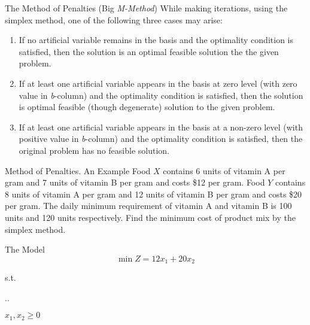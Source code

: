 \begin{frame}{The Method of Penalties (Big \emph{M-Method})}
  While making iterations, using the simplex method, one of the following three cases may arise:
  \begin{enumerate} \justifying \parskip5mm
  \item If \alert{no artificial variable remains in the basis} and the optimality condition is satisfied, then \alert{the solution is an optimal feasible solution the the given problem}.
  \item If at least one \alert{artificial variable appears in the basis at zero} level (with zero value in \emph{b}-column) and the optimality condition is satisfied, then \alert{the solution is optimal feasible (though degenerate)} solution to the given problem.
  \item If at least \alert{one artificial variable appears in the basis at a non-zero level} (with positive value in \emph{b}-column) and the optimality condition is satisfied, then \alert{the original problem has no feasible solution}.
  \end{enumerate}
\end{frame}

\begin{frame}{Method of Penalties. An Example}{}
      Food $X$ contains 6 units of vitamin A per gram and 7 units of vitamin B per gram and costs \$12  per gram. Food $Y$ contains 8 units of vitamin A per gram and 12 units of vitamin B per gram and costs \$20  per gram. The daily minimum requirement of vitamin A and vitamin B is 100 units and 120 units respectively. Find the minimum cost of product mix by the simplex method.


      \begin{block}{The Model} \justifying
          \[\min Z = 12x_1 + 20x_2\]

          {\centering
            s.t.

            \sysdelim..%

            $    x_1, x_2  \geq 0$
            \par}
      \end{block}
\end{frame}

